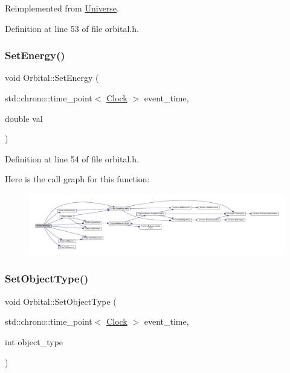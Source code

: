 Reimplemented from \hyperlink{class_universe_aa22202ae740eb1355529afcb13285e91}{Universe}.



Definition at line 53 of file orbital.\+h.

\mbox{\label{class_orbital_a20b0f4d549fd9024df89603a5adcc214}} 
\subsubsection{\texorpdfstring{Set\+Energy()}{SetEnergy()}}
{\footnotesize\ttfamily void Orbital\+::\+Set\+Energy (\begin{DoxyParamCaption}\item[{std\+::chrono\+::time\+\_\+point$<$ \hyperlink{universe_8h_a0ef8d951d1ca5ab3cfaf7ab4c7a6fd80}{Clock} $>$}]{event\+\_\+time,  }\item[{double}]{val }\end{DoxyParamCaption})\hspace{0.3cm}{\ttfamily [inline]}}



Definition at line 54 of file orbital.\+h.

Here is the call graph for this function\+:
\nopagebreak
\begin{figure}[H]
\begin{center}
\leavevmode
\includegraphics[width=350pt]{class_orbital_a20b0f4d549fd9024df89603a5adcc214_cgraph}
\end{center}
\end{figure}
\mbox{\label{class_orbital_afd0dfd382d4bf7d9fbace315bd37fa85}} 
\subsubsection{\texorpdfstring{Set\+Object\+Type()}{SetObjectType()}}
{\footnotesize\ttfamily void Orbital\+::\+Set\+Object\+Type (\begin{DoxyParamCaption}\item[{std\+::chrono\+::time\+\_\+point$<$ \hyperlink{universe_8h_a0ef8d951d1ca5ab3cfaf7ab4c7a6fd80}{Clock} $>$}]{event\+\_\+time,  }\item[{int}]{object\+\_\+type }\end{DoxyParamCaption})}



